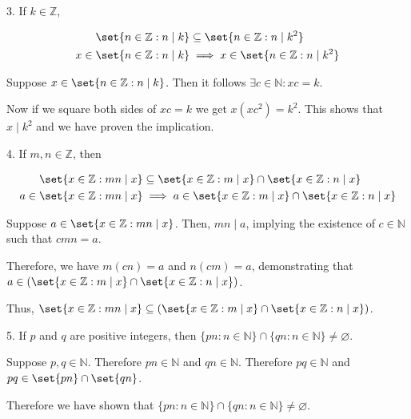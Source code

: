 \documentclass{hippoidC}
\begin{document}
\begin{prooflist}{3. If $k \in \mathbb{Z}$,}
	\item

	\begin{align*}
		\set{n \in \mathbb{Z}: n \mid k}       & \subseteq \set{n \in \mathbb{Z}: n \mid k^2}      \\
		x \in \set{n \in \mathbb{Z}: n \mid k} & \implies x \in \set{n \in \mathbb{Z}: n \mid k^2}
	\end{align*}
	\item Suppose $x \in \set{n \in \mathbb{Z}: n \mid k}$. Then it follows $\exists
		c\in\mathbb{N}: xc=k$.
	\item Now if we square both sides of
	$xc=k$ we get $x(xc^2) = k^2$.  This shows that $x\mid k^2$ and we have proven
	the implication.
\end{prooflist}

\begin{prooflist}{4. If $m, n \in \mathbb{Z}$, then}
	\item
	\begin{align*}
		\set{x \in \mathbb{Z}: mn \mid x}       & \subseteq \set{x \in \mathbb{Z}: m \mid x} \cap \set{x \in \mathbb{Z}: n \mid x}      \\
		a \in \set{x \in \mathbb{Z}: mn \mid x} & \implies a \in \set{x \in \mathbb{Z}: m \mid x} \cap \set{x \in \mathbb{Z}: n \mid x}
	\end{align*}
	\item Suppose $a \in \set{x \in \mathbb{Z}: mn \mid x}$. Then, $mn \mid a$, implying the existence of $c \in \mathbb{N}$ such that $cmn = a$.
	\item Therefore, we have $m(cn) = a$ and $n(cm) = a$, demonstrating that $a \in \left(\set{x \in \mathbb{Z}: m \mid x} \cap \set{x \in \mathbb{Z}: n \mid x}\right)$.
	\item Thus, $\set{x \in \mathbb{Z}: mn \mid x} \subseteq \left(\set{x \in \mathbb{Z}: m \mid x} \cap \set{x \in \mathbb{Z}: n \mid x}\right)$.
\end{prooflist}

\begin{prooflist}{5. If $p$ and $q$ are positive integers, then $\{p n: n \in
			\mathbb{N}\} \cap\{q n: n \in \mathbb{N}\} \neq \varnothing$.}
	\item Suppose $p, q \in \mathbb{N}$. Therefore $pn \in \mathbb{N}$ and
	$qn \in \mathbb{N}$. Therefore $pq \in \mathbb{N}$ and $pq \in \set{pn} \cap
		\set{qn}$.
	\item Therefore we have shown that
	$\{p n: n \in \mathbb{N}\} \cap\{q n: n \in \mathbb{N}\} \neq \varnothing$.
\end{prooflist}
\end{document}
